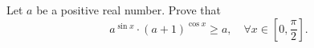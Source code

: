 Let $ a $ be a positive real number. Prove that
$$ a^{\sin x}\cdot (a+1)^{\cos x}\ge a,\quad\forall x\in \left[ 0,\frac{\pi }{2} \right] . $$